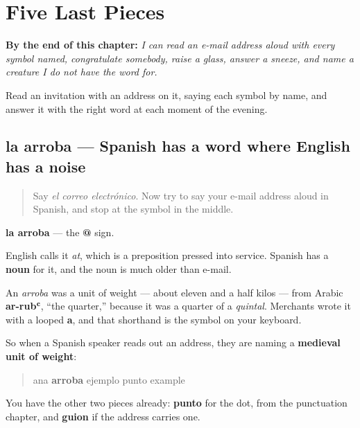 
\chapter{Five Last Pieces}
\label{ch:piezas-sueltas}

\begin{chapteropening}
\textbf{By the end of this chapter:} \emph{I can read an e-mail address aloud with every symbol named, congratulate somebody, raise a glass, answer a sneeze, and name a creature I do not have the word for.}

Read an invitation with an address on it, saying each symbol by name, and answer it with the right word at each moment of the evening.
\end{chapteropening}

\section[la arroba]{la arroba — Spanish has a word where English has a noise}

\label{lesson:ES-C428-arroba}



\begin{quote}
Say \emph{el correo electrónico}. Now try to say your e-mail address aloud in Spanish, and stop at the symbol in the middle.
\end{quote}

\begin{cousinweb}
\textbf{la arroba} — the \textbf{@} sign.

English calls it \emph{at}, which is a preposition pressed into service. Spanish has a \textbf{noun} for it, and the noun is much older than e-mail.

An \emph{arroba} was a unit of weight — about eleven and a half kilos — from Arabic \textbf{ar-rubʿ}, \textquotedblleft{}the quarter,\textquotedblright{} because it was a quarter of a \emph{quintal}. Merchants wrote it with a looped \textbf{a}, and that shorthand is the symbol on your keyboard.

So when a Spanish speaker reads out an address, they are naming a \textbf{medieval unit of weight}:

\begin{quote}
ana \textbf{arroba} ejemplo punto example
\end{quote}

You have the other two pieces already: \textbf{punto} for the dot, from the punctuation chapter, and \textbf{guion} if the address carries one.
\end{cousinweb}

